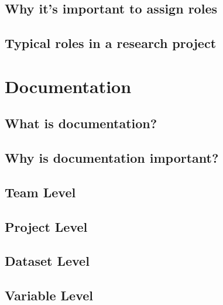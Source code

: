 \documentclass[
]{book}
\begin{document}
\hypertarget{why-its-important-to-assign-roles}{%
\section{Why it's important to assign roles}\label{why-its-important-to-assign-roles}}

\hypertarget{typical-roles-in-a-research-project}{%
\section{Typical roles in a research project}\label{typical-roles-in-a-research-project}}

\hypertarget{documentation}{%
\chapter{Documentation}\label{documentation}}

\hypertarget{what-is-documentation}{%
\section{What is documentation?}\label{what-is-documentation}}

\hypertarget{why-is-documentation-important}{%
\section{Why is documentation important?}\label{why-is-documentation-important}}

\hypertarget{team-level}{%
\section{Team Level}\label{team-level}}

\hypertarget{project-level}{%
\section{Project Level}\label{project-level}}

\hypertarget{dataset-level}{%
\section{Dataset Level}\label{dataset-level}}

\hypertarget{variable-level}{%
\section{Variable Level}\label{variable-level}}
\end{document}
